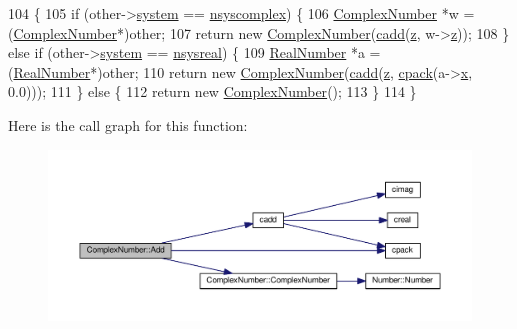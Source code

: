 \begin{DoxyCode}
104 \{
105     \textcolor{keywordflow}{if} (other->\hyperlink{structNumber_a2ceda5601c42288626e76b06878e7476}{system} == \hyperlink{numb_8h_a1475a201d2346881ce88dfbacf628c7da3b38c947375a3db3a4bc184a11c8ee42}{nsyscomplex}) \{
106         \hyperlink{structComplexNumber}{ComplexNumber} *w = (\hyperlink{structComplexNumber}{ComplexNumber}*)other;
107         \textcolor{keywordflow}{return} \textcolor{keyword}{new} \hyperlink{structComplexNumber_a610e9db9ff0ddb0140e30d235ab64e44}{ComplexNumber}(\hyperlink{complex_8h_a02d8fd1ce9c4fa4e25b1fa676ca96d4e}{cadd}(\hyperlink{structComplexNumber_a5f72da71f4ce0d88076a391369239042}{z}, w->\hyperlink{structComplexNumber_a5f72da71f4ce0d88076a391369239042}{z}));
108     \} \textcolor{keywordflow}{else}  \textcolor{keywordflow}{if} (other->\hyperlink{structNumber_a2ceda5601c42288626e76b06878e7476}{system} == \hyperlink{numb_8h_a1475a201d2346881ce88dfbacf628c7dae72cf8673109b15268d1c0837e8bff86}{nsysreal}) \{
109         \hyperlink{structRealNumber}{RealNumber} *a = (\hyperlink{structRealNumber}{RealNumber}*)other;
110         \textcolor{keywordflow}{return} \textcolor{keyword}{new} \hyperlink{structComplexNumber_a610e9db9ff0ddb0140e30d235ab64e44}{ComplexNumber}(\hyperlink{complex_8h_a02d8fd1ce9c4fa4e25b1fa676ca96d4e}{cadd}(\hyperlink{structComplexNumber_a5f72da71f4ce0d88076a391369239042}{z}, \hyperlink{complex_8h_a980e6e049f7902b05fc9eb5614b07a5c}{cpack}(a->\hyperlink{structRealNumber_ac33d80bee75448490199a0aa48ccce1e}{x}, 0.0)));
111     \} \textcolor{keywordflow}{else} \{
112         \textcolor{keywordflow}{return} \textcolor{keyword}{new} \hyperlink{structComplexNumber_a610e9db9ff0ddb0140e30d235ab64e44}{ComplexNumber}();
113     \}
114 \}
\end{DoxyCode}


Here is the call graph for this function\+:\nopagebreak
\begin{figure}[H]
\begin{center}
\leavevmode
\includegraphics[width=350pt]{structComplexNumber_ad6b9fb6fe480c3a626f4e105024d2375_cgraph}
\end{center}
\end{figure}



